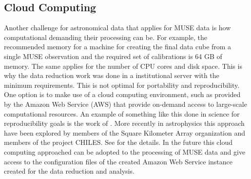 \subsection{Cloud Computing}

Another challenge for astronomical data that applies for MUSE data is how computational demanding their processing can be. For example, the recommended memory for a machine for creating the final data cube from a single MUSE observation and the required set of calibrations is 64 GB of memory. The same applies for the number of CPU cores and disk space. This is why the data reduction work was done in a institutional server with the minimum requirements. This is not optimal for portability and reproducibility. One option is to make use of a cloud computing environment, such as provided by the Amazon Web Service (AWS) that provide on-demand access to large-scale computational resources. An example of something like this done in science for reproducibility goals is the work of \cite{ragan-kelley_collaborative_2013}. More recently in astrophysics this approach have been explored by members of the Square Kilometer Array organization and members of the project CHILES. See \cite{Dodson_SKAAmazon_2016} for the details. In the future this cloud computing approached can be adopted to the processing of MUSE data and give access to the configuration files of the created Amazon Web Service instance created for the data reduction and analysis.  


